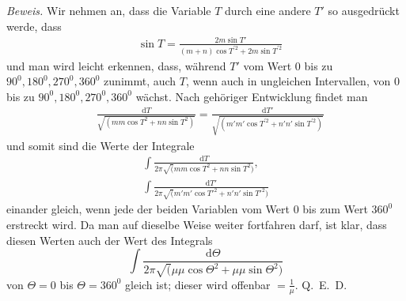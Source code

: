\emph{Beweis.} Wir nehmen an, dass die Variable $T$ durch eine andere $T'$ so ausgedrückt werde, dass
\[
\begin{aligned}
&\sin T=\frac{2m\sin T'}{(m+n)\cos T^{\prime 2}+2m\sin T^{\prime 2}}
\end{aligned}
\]
und man wird leicht erkennen, dass, während $T'$ vom Wert $0$ bis zu $90^0,180^0,270^0,360^0$ zunimmt, auch $T$, wenn auch in ungleichen Intervallen, von $0$ bis zu $90^0,180^0,270^0,360^0$ wächst. Nach gehöriger Entwicklung findet man
\[
\begin{aligned}
&\frac{\mathrm dT}{\surd{(mm\cos T^2+nn\sin T^2)}}
=\frac{\mathrm dT'}{\surd{(m'm'\cos T^{\prime 2}+n'n'\sin T^{\prime 2})}}
\end{aligned}
\]
und somit sind die Werte der Integrale
\[
\begin{gathered}\int\frac{\mathrm{d}T}{2\pi\surd(mm\cos T^2+nn\sin T^2)},\\[7pt]
\int\frac{\mathrm{d}T'}{2\pi\surd(m'm'\cos T'^2+n'n'\sin T'^2)}\end{gathered}
\]
einander gleich, wenn jede der beiden Variablen vom Wert $0$ bis zum Wert $360^{0}$ erstreckt wird. Da man auf dieselbe Weise weiter fortfahren darf, ist klar, dass diesen Werten auch der Wert des Integrals
\[
\int\frac{\mathrm{d}\Theta}{2\pi\surd(\mu\mu\cos\Theta^2+\mu\mu\sin\Theta^2)}
\]
von $\Theta=0$ bis $\Theta=360^{0}$ gleich ist; dieser wird offenbar $=\frac{1}{\mu}$. Q.~E.~D.

